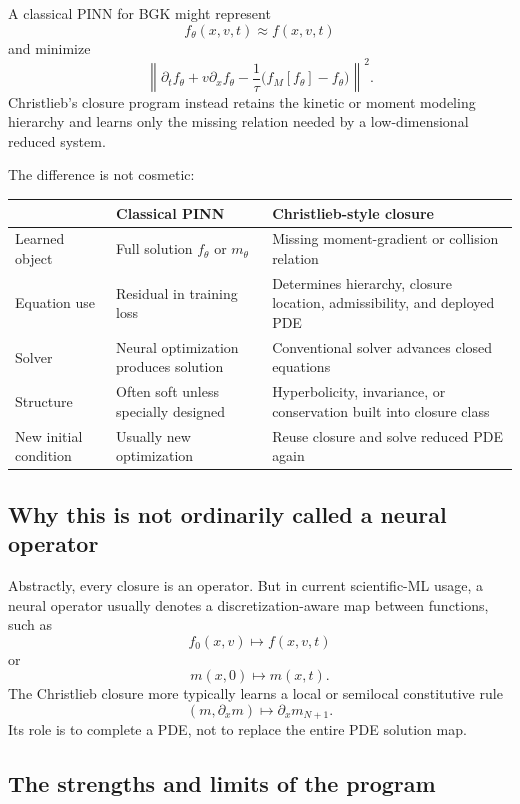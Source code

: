 \documentclass[11pt]{article}
\begin{document}
A classical PINN for BGK might represent
\[
 f_\theta(x,v,t)\approx f(x,v,t)
\]
and minimize
\begin{equation}
 \left\|
 \partial_tf_\theta+v\partial_xf_\theta
 -\frac1\tau\bigl(f_M[f_\theta]-f_\theta\bigr)
 \right\|^2.
\end{equation}
Christlieb's closure program instead retains the kinetic or moment modeling hierarchy and learns only the missing relation needed by a low-dimensional reduced system.

The difference is not cosmetic:
\begin{center}
\begin{tabularx}{\textwidth}{@{}P{0.22\textwidth}Y Y@{}}
\toprule
& \textbf{Classical PINN} & \textbf{Christlieb-style closure} \\
\midrule
Learned object & Full solution \(f_\theta\) or \(m_\theta\) & Missing moment-gradient or collision relation \\
Equation use & Residual in training loss & Determines hierarchy, closure location, admissibility, and deployed PDE \\
Solver & Neural optimization produces solution & Conventional solver advances closed equations \\
Structure & Often soft unless specially designed & Hyperbolicity, invariance, or conservation built into closure class \\
New initial condition & Usually new optimization & Reuse closure and solve reduced PDE again \\
\bottomrule
\end{tabularx}
\end{center}

\subsection{Why this is not ordinarily called a neural operator}

Abstractly, every closure is an operator. But in current scientific-ML usage, a neural operator usually denotes a discretization-aware map between functions, such as
\[
 f_0(x,v)\longmapsto f(x,v,t)
\]
or
\[
 m(x,0)\longmapsto m(x,t).
\]
The Christlieb closure more typically learns a local or semilocal constitutive rule
\[
 (m,\partial_xm)\longmapsto\partial_xm_{N+1}.
\]
Its role is to complete a PDE, not to replace the entire PDE solution map.

\subsection{The strengths and limits of the program}
\end{document}
